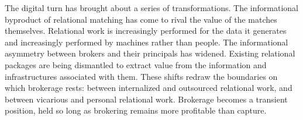 \documentclass[
]{article}
\begin{document}
The digital turn has brought about a series of transformations. The informational byproduct of relational matching has come to rival the value of the matches themselves. Relational work is increasingly performed for the data it generates and increasingly performed by machines rather than people. The informational asymmetry between brokers and their principals has widened. Existing relational packages are being dismantled to extract value from the information and infrastructures associated with them. These shifts redraw the boundaries on which brokerage rests: between internalized and outsourced relational work, and between vicarious and personal relational work. Brokerage becomes a transient position, held so long as brokering remains more profitable than capture.

\nocite{borgattiStructuralHolesUnpacking1997,brandesFasterAlgorithmBetweenness2001,everettUnpackingBurtsConstraint2020,freemanSetMeasuresCentrality1977}
\printbibliography[heading=bibnumbered,title={References}]
\end{document}
